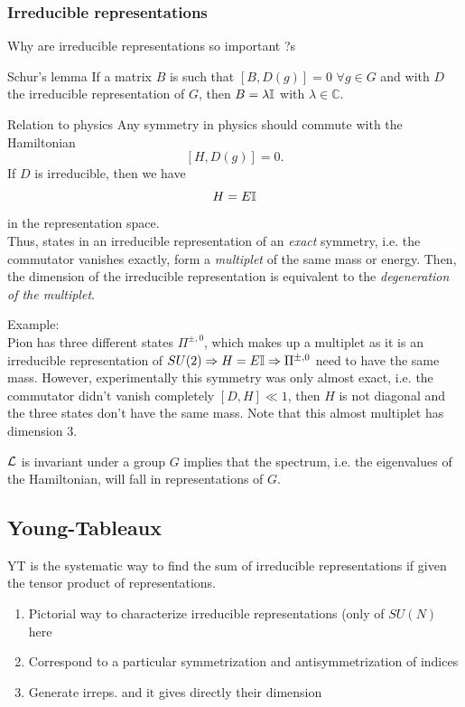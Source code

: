 \subsubsection{Irreducible representations}
Why are irreducible representations so important ?s
\begin{mybox}{Schur's lemma}
	If a matrix $B$ is such that $[B,D(g)]=0$ $\forall g\in G$ and with $D$ the irreducible representation of $G$, then $B=\lambda \mathbb{I}$ with $\lambda\in \mathbb{C}$.
\end{mybox}
\begin{mybox}{Relation to physics}
Any symmetry in physics should commute with the Hamiltonian 
\begin{equation}
\label{eq:schurlemma}
	[H,D(g)]=0.
\end{equation}
If $D$ is irreducible, then we have 
\begin{equation}
	H = E \mathbb{I}
\end{equation}
in the representation space.\\
Thus, states in an irreducible representation of an \emph{exact} symmetry, i.e. the commutator vanishes exactly, form a \emph{multiplet} of the same mass or energy. Then, the dimension of the irreducible representation is equivalent to the \emph{degeneration of the multiplet}.
\end{mybox}
Example:\\
Pion has three different states $\Pi^{\pm,0}$, which makes up a multiplet as it is an irreducible representation of $SU(2) \Rightarrow H=E\mathbb{I} \Rightarrow \Pi^{\pm,0}$ need to have the same mass. However, experimentally this symmetry was only almost exact, i.e. the commutator didn't vanish completely $[D,H] \ll 1$, then $H$ is not diagonal and the three states don't have the same mass. Note that this almost multiplet has dimension $3$.
\begin{mybox}{}
	$\mathcal{L}$ is invariant under a group $G$ implies that the spectrum, i.e. the eigenvalues of the Hamiltonian, will fall in representations of $G$.
\end{mybox}

\subsection{Young-Tableaux}
YT is the systematic way to find the sum of irreducible representations if given the tensor product of representations.
\begin{enumerate}
\item Pictorial way to characterize irreducible representations (only of $SU(N)$ here
\item Correspond to a particular symmetrization and antisymmetrization of indices
\item Generate irreps. and it gives directly their dimension
\end{enumerate}

